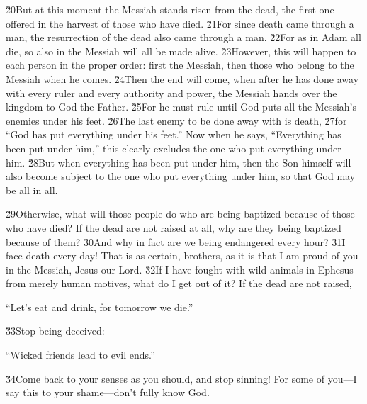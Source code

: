 \v{20}But at this moment the Messiah stands risen from the dead, the first one offered in the harvest of those who have died. \v{21}For since death came through a man, the resurrection of the dead also came through a man. \v{22}For as in Adam all die, so also in the Messiah will all be made alive. \v{23}However, this will happen to each person in the proper order: first the Messiah, then those who belong to the Messiah when he comes. \v{24}Then the end will come, when after he has done away with every ruler and every authority and power, the Messiah hands over the kingdom to God the Father. \v{25}For he must rule until God puts all the Messiah's enemies under his feet. \v{26}The last enemy to be done away with is death, \v{27}for ``God has put everything under his feet.'' Now when he says, ``Everything has been put under him,'' this clearly excludes the one who put everything under him. \v{28}But when everything has been put under him, then the Son himself will also become subject to the one who put everything under him, so that God may be all in all.

\v{29}Otherwise, what will those people do who are being baptized because of those who have died? If the dead are not raised at all, why are they being baptized because of them? \v{30}And why in fact are we being endangered every hour? \v{31}I face death every day! That is as certain, brothers, as it is that I am proud of you in the Messiah, Jesus our Lord. \v{32}If I have fought with wild animals in Ephesus from merely human motives, what do I get out of it? If the dead are not raised,

\begin{poetry}
\poeml ``Let's eat and drink, for tomorrow we die.''
\end{poetry}

\v{33}Stop being deceived:

\begin{poetry}
\poeml ``Wicked friends lead to evil ends.''
\end{poetry}

\v{34}Come back to your senses as you should, and stop sinning! For some of you---I say this to your shame---don't fully know God.

